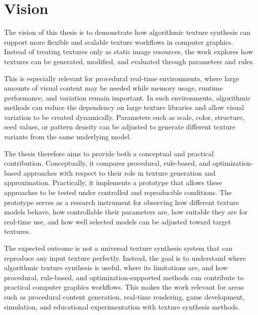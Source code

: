 \section{Vision}

The vision of this thesis is to demonstrate how algorithmic texture synthesis can support more flexible and scalable texture workflows in computer graphics. Instead of treating textures only as static image resources, the work explores how textures can be generated, modified, and evaluated through parameters and rules.

This is especially relevant for procedural real-time environments, where large amounts of visual content may be needed while memory usage, runtime performance, and variation remain important. In such environments, algorithmic methods can reduce the dependency on large texture libraries and allow visual variation to be created dynamically. Parameters such as scale, color, structure, seed values, or pattern density can be adjusted to generate different texture variants from the same underlying model.

The thesis therefore aims to provide both a conceptual and practical contribution. Conceptually, it compares procedural, rule-based, and optimization-based approaches with respect to their role in texture generation and approximation. Practically, it implements a prototype that allows these approaches to be tested under controlled and reproducible conditions. The prototype serves as a research instrument for observing how different texture models behave, how controllable their parameters are, how suitable they are for real-time use, and how well selected models can be adjusted toward target textures.

The expected outcome is not a universal texture synthesis system that can reproduce any input texture perfectly. Instead, the goal is to understand where algorithmic texture synthesis is useful, where its limitations are, and how procedural, rule-based, and optimization-supported methods can contribute to practical computer graphics workflows. This makes the work relevant for areas such as procedural content generation, real-time rendering, game development, simulation, and educational experimentation with texture synthesis methods.